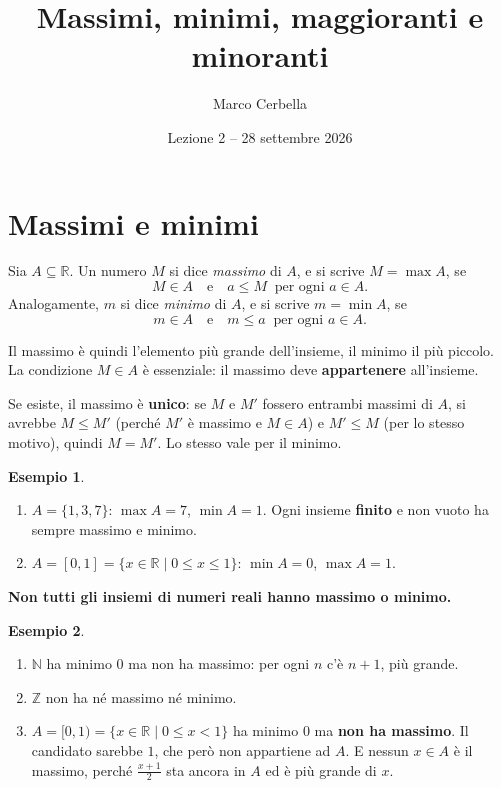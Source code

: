 \documentclass[11pt,a4paper]{article}
\title{Massimi, minimi, maggioranti e minoranti}
\author{Marco Cerbella}
\date{Lezione 2 -- 28 settembre 2026}
\theoremstyle{definition}
\newtheorem*{esempio}{Esempio}
\begin{document}
\maketitle

\section{Massimi e minimi}

\begin{definizione}
Sia $A \subseteq \mathbb{R}$. Un numero $M$ si dice \emph{massimo} di $A$,
e si scrive $M = \max A$, se
\[
M \in A \quad \text{e} \quad a \leq M \ \text{ per ogni } a \in A.
\]
Analogamente, $m$ si dice \emph{minimo} di $A$, e si scrive $m = \min A$, se
\[
m \in A \quad \text{e} \quad m \leq a \ \text{ per ogni } a \in A.
\]
\end{definizione}

Il massimo è quindi l'elemento più grande dell'insieme, il minimo il più
piccolo. La condizione $M \in A$ è essenziale: il massimo deve
\textbf{appartenere} all'insieme.

Se esiste, il massimo è \textbf{unico}: se $M$ e $M'$ fossero entrambi
massimi di $A$, si avrebbe $M \leq M'$ (perché $M'$ è massimo e $M \in A$) e
$M' \leq M$ (per lo stesso motivo), quindi $M = M'$. Lo stesso vale per il
minimo.

\begin{esempio}
\leavevmode
\begin{enumerate}
    \item $A = \{1, 3, 7\}$: $\max A = 7$, $\min A = 1$. Ogni insieme
          \textbf{finito} e non vuoto ha sempre massimo e minimo.
    \item $A = [0, 1] = \{x \in \mathbb{R} \mid 0 \leq x \leq 1\}$:
          $\min A = 0$, $\max A = 1$.
\end{enumerate}
\end{esempio}

\textbf{Non tutti gli insiemi di numeri reali hanno massimo o minimo.}

\begin{esempio}
\leavevmode
\begin{enumerate}
    \item $\mathbb{N}$ ha minimo $0$ ma non ha massimo: per ogni $n$ c'è
          $n + 1$, più grande.
    \item $\mathbb{Z}$ non ha né massimo né minimo.
    \item $A = [0, 1) = \{x \in \mathbb{R} \mid 0 \leq x < 1\}$ ha minimo
          $0$ ma \textbf{non ha massimo}. Il candidato sarebbe $1$, che però
          non appartiene ad $A$. E nessun $x \in A$ è il massimo, perché
          $\frac{x + 1}{2}$ sta ancora in $A$ ed è più grande di $x$.
\end{enumerate}
\end{esempio}
\end{document}
